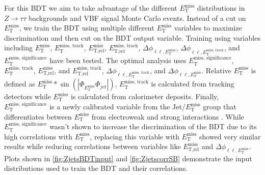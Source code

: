 For this BDT we aim to take advantage of the different $E_{\text{T}}^{\text{miss}}$ distributions in $Z\rightarrow\tau\tau$ backgrounds and VBF signal Monte Carlo events. Instead of a cut on $E_{\text{T}}^{\text{miss}}$, we train the BDT using multiple different $E_{\text{T}}^{\text{miss}}$ variables to maximize discrimination and then cut on the BDT output variable. Training using variables including $E_{\text{T}}^{\text{miss}}$, $\ensuremath{E_{\text{T}}^{\text{miss, track}}}$, $\ensuremath{E_{\text{T,rel}}^{\text{miss}}}$, $\ensuremath{E_{\text{T,rel}}^{\text{miss, track}}}$, $\Delta\phi_{\ell\ell,E_{\text{T}}^{\text{miss}}}$, $\Delta\phi_{\ell\ell,E_{\text{T}}^{\text{miss, track}}}$, and $\ensuremath{E_{\text{T}}^{\text{miss, significance}}}$ have been tested. The optimal analysis uses $\ensuremath{E_{\text{T}}^{\text{miss, significance}}}$, $\ensuremath{E_{\text{T}}^{\text{miss, track}}}$, $\ensuremath{E_{\text{T,rel}}^{\text{miss}}}$, and $\ensuremath{E_{\text{T,rel}}^{\text{miss, track}}}$, $\ensuremath{\Delta\phi_{\ell\ell,E_{\text{T}}^{\text{miss, track}}}}$, and $\ensuremath{\Delta\phi_{\ell\ell,E_{\text{T}}^{\text{miss}}}}$. Relative $E_{\text{T}}^{\text{miss}}$ is defined as $E_{\text{T}}^{\text{miss}} * \sin(|\Phi_{E_{\text{T}}^{\text{miss}}}\Phi_{jet}|)$, $\ensuremath{E_{\text{T}}^{\text{miss, track}}}$ is calculated from tracking detectors while $E_{\text{T}}^{\text{miss}}$ is calculated from calorimeter deposits. Finally, $\ensuremath{E_{\text{T}}^{\text{miss, significance}}}$ is a newly calibrated variable from the Jet/$E_{\text{T}}^{\text{miss}}$ group that differentiates between $E_{\text{T}}^{\text{miss}}$ from electroweak and strong interactions \cite{JETEtmiss}. While $\ensuremath{E_{\text{T}}^{\text{miss, significance}}}$ wasn't shown to increase the discrimination of the BDT due to its high correlations with $E_{\text{T}}^{\text{miss}}$, replacing this variable with $E_{\text{T}}^{\text{miss}}$ showed very similar results while reducing correlations between variables like $\ensuremath{E_{\text{T,rel}}^{\text{miss}}}$ and $\ensuremath{\Delta\phi_{\ell\ell,E_{\text{T}}^{\text{miss}}}}$. Plots shown in \ref{fig:ZjetsBDTinput} and \ref{fig:ZjetscorrSB} demonstrate the input distributions used to train the BDT and their correlations.

